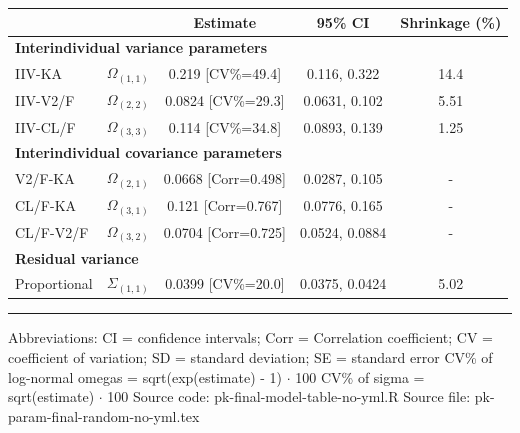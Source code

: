 \setlength{\tabcolsep}{5pt} 
\begin{threeparttable}
\renewcommand{\arraystretch}{1.3}
\begin{tabular}[h]{lcccc}
\hline
 &  & Estimate & 95\% CI & Shrinkage (\%) \\
\hline
\multicolumn{5}{l}{\textbf{Interindividual variance parameters}}\\%
IIV-KA & $\Omega_{(1,1)}$ & 0.219 [CV\%=49.4] & 0.116, 0.322 & 14.4 \\
IIV-V2/F & $\Omega_{(2,2)}$ & 0.0824 [CV\%=29.3] & 0.0631, 0.102 & 5.51 \\
IIV-CL/F & $\Omega_{(3,3)}$ & 0.114 [CV\%=34.8] & 0.0893, 0.139 & 1.25 \\
\hline \multicolumn{5}{l}{\textbf{Interindividual covariance parameters}}\\%
V2/F-KA & $\Omega_{(2,1)}$ & 0.0668 [Corr=0.498] & 0.0287, 0.105 & - \\
CL/F-KA & $\Omega_{(3,1)}$ & 0.121 [Corr=0.767] & 0.0776, 0.165 & - \\
CL/F-V2/F & $\Omega_{(3,2)}$ & 0.0704 [Corr=0.725] & 0.0524, 0.0884 & - \\
\hline \multicolumn{5}{l}{\textbf{Residual variance}}\\%
Proportional & $\Sigma_{(1,1)}$ & 0.0399 [CV\%=20.0] & 0.0375, 0.0424 & 5.02 \\
\hline
\end{tabular}
\end{threeparttable}
 
\vspace{0.67cm}
 
\begin{minipage}{1\linewidth}
\linespread{1.1}\selectfont
\rule{1\linewidth}{0.4pt}
\vspace{0.02cm}
Abbreviations: CI = confidence intervals; 
                        Corr = Correlation coefficient;
                        CV = coefficient of variation;
                        SD = standard deviation;
                        SE = standard error \newline
CV\% of log-normal omegas = sqrt(exp(estimate) - 1) $\cdot$ 100 \newline
CV\% of sigma = sqrt(estimate) $\cdot$ 100 \newline
Source code: pk-final-model-table-no-yml.R \newline
Source file: pk-param-final-random-no-yml.tex \newline
\end{minipage}
